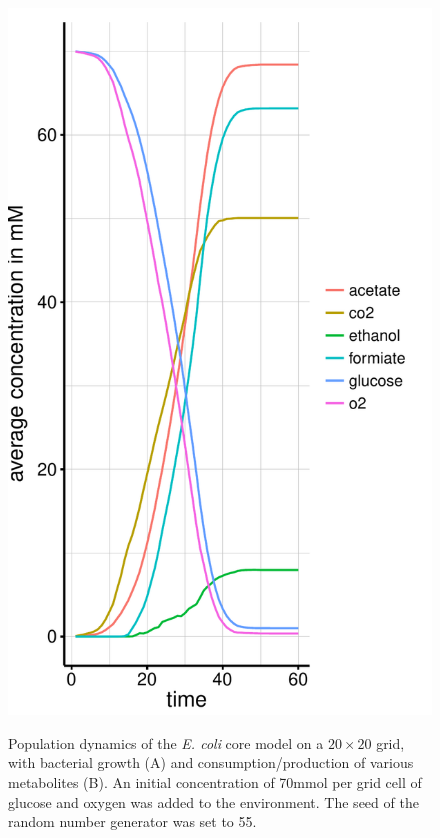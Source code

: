 \begin{figure}[h!]
{    \includegraphics[scale=0.45]{../results/img/ecoli_20x20_aerob_seed55_subs.pdf}
  }
  \caption{Population dynamics of the \emph{E. coli} core model on a $20\times20$ grid, with bacterial growth (A) and consumption/production of various metabolites (B). An initial concentration of 70\;mmol per grid cell of glucose and oxygen was added to the environment. The seed of the random number generator was set to 55.}
\label{fig:ecoresg}
\end{figure}
